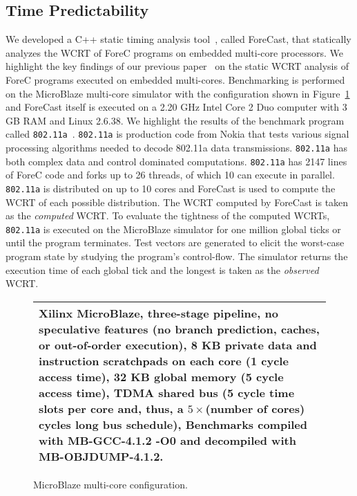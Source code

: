 \subsection{Time Predictability}
We developed a C++ static timing analysis
tool~\cite{YipRAG13}, called ForeCast, that statically
analyzes the WCRT of ForeC programs on embedded multi-core
processors. We highlight the key findings of our previous
paper~\cite{YipRAG13} on the static WCRT analysis of ForeC
programs executed on embedded multi-cores.
Benchmarking is performed on the MicroBlaze multi-core
simulator with the configuration shown in
Figure~\ref{fig:results_embedded_static_specs} and
ForeCast itself is executed on a 2.20 GHz Intel Core 2 Duo
computer with 3 GB RAM and Linux 2.6.38. We
highlight the results of the benchmark program
called \verb$802.11a$~\cite{streaming_openmp_extension}.
\verb$802.11a$ is production code from Nokia that tests
various signal processing algorithms needed to decode
802.11a data transmissions. \verb$802.11a$ has both complex
data and control dominated computations. \verb$802.11a$ has 
2147 lines of ForeC code and forks up to 26 threads, of which 
10 can execute in parallel. \verb$802.11a$ is 
distributed on up to 10 cores and ForeCast is used to 
compute the WCRT of each possible distribution. 
The WCRT computed by ForeCast is taken as the \emph{computed} WCRT.
To evaluate the tightness of the computed WCRTs, \verb$802.11a$ 
is executed on the MicroBlaze simulator for one million 
global ticks or until the program terminates. Test
vectors are generated to elicit the worst-case program state by
studying the program's control-flow. The simulator returns
the execution time of each global tick and the longest is
taken as the \emph{observed} WCRT. 

\begin{figure}
	\centering
	\def\arraystretch{1.3}
	\begin{tabular}{|p{\textwidth}|}
		\hline
		Xilinx MicroBlaze, three-stage pipeline, no speculative	
		features (no branch prediction,	caches, or out-of-order execution), 
		8 KB private data and instruction scratchpads on each core 
		(1 cycle access time), 32 KB global memory 
		(5 cycle access time), TDMA shared bus (5 cycle time slots per			
		core and, thus, a $5\times$(number of cores) 
		cycles long bus schedule), Benchmarks compiled with MB-GCC-4.1.2 -O0 and 
		decompiled with MB-OBJDUMP-4.1.2.
		\\ \hline
	\end{tabular}
	
	\caption{MicroBlaze multi-core configuration.}
	\label{fig:results_embedded_static_specs}
\end{figure}

